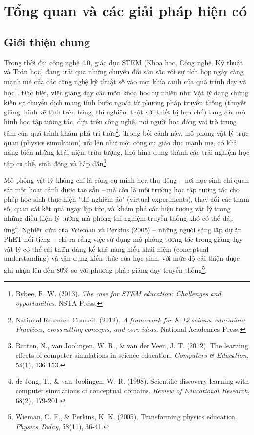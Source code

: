 \chapter{Tổng quan và các giải pháp hiện có}

\section{Giới thiệu chung}

Trong thời đại công nghệ 4.0, giáo dục STEM (Khoa học, Công nghệ, Kỹ thuật và Toán học) đang trải qua những chuyển đổi sâu sắc với sự tích hợp ngày càng mạnh mẽ của các công nghệ kỹ thuật số vào mọi khía cạnh của quá trình dạy và học\footnote{Bybee, R. W. (2013). \textit{The case for STEM education: Challenges and opportunities}. NSTA Press.}. Đặc biệt, việc giảng dạy các môn khoa học tự nhiên như Vật lý đang chứng kiến sự chuyển dịch mang tính bước ngoặt từ phương pháp truyền thống (thuyết giảng, hình vẽ tĩnh trên bảng, thí nghiệm thật với thiết bị hạn chế) sang các mô hình học tập tương tác, dựa trên công nghệ, nơi người học đóng vai trò trung tâm của quá trình khám phá tri thức\footnote{National Research Council. (2012). \textit{A framework for K-12 science education: Practices, crosscutting concepts, and core ideas}. National Academies Press.}. Trong bối cảnh này, mô phỏng vật lý trực quan (physics simulation) nổi lên như một công cụ giáo dục mạnh mẽ, có khả năng biến những khái niệm trừu tượng, khó hình dung thành các trải nghiệm học tập cụ thể, sinh động và hấp dẫn\footnote{Rutten, N., van Joolingen, W. R., \& van der Veen, J. T. (2012). The learning effects of computer simulations in science education. \textit{Computers \& Education}, 58(1), 136-153.}.

Mô phỏng vật lý không chỉ là công cụ minh họa thụ động – nơi học sinh chỉ quan sát một hoạt cảnh được tạo sẵn – mà còn là môi trường học tập tương tác cho phép học sinh thực hiện "thí nghiệm ảo" (virtual experiments), thay đổi các tham số, quan sát kết quả ngay lập tức, và khám phá các hiện tượng vật lý trong những điều kiện lý tưởng mà phòng thí nghiệm truyền thống khó có thể đáp ứng\footnote{de Jong, T., \& van Joolingen, W. R. (1998). Scientific discovery learning with computer simulations of conceptual domains. \textit{Review of Educational Research}, 68(2), 179-201.}. Nghiên cứu của Wieman và Perkins (2005) – những người sáng lập dự án PhET nổi tiếng – chỉ ra rằng việc sử dụng mô phỏng tương tác trong giảng dạy vật lý có thể cải thiện đáng kể khả năng hiểu khái niệm (conceptual understanding) và vận dụng kiến thức của học sinh, với mức độ cải thiện được ghi nhận lên đến 80\% so với phương pháp giảng dạy truyền thống\footnote{Wieman, C. E., \& Perkins, K. K. (2005). Transforming physics education. \textit{Physics Today}, 58(11), 36-41.}.

